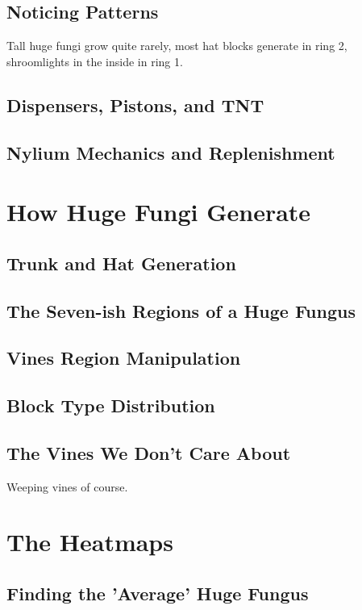 \documentclass[11pt,a4paper]{article}
\begin{document}
    \subsection{Noticing Patterns}
Tall huge fungi grow quite rarely, most hat blocks generate in ring 2, shroomlights in the inside in ring 1.
    \lipsum[8]
    \subsection{Dispensers, Pistons, and TNT}
    \lipsum[9]
    \subsection{Nylium Mechanics and Replenishment}
    \lipsum[9]
    
\section{How Huge Fungi Generate}
    \subsection{Trunk and Hat Generation} %
    \lipsum[10]
    \subsection{The Seven-ish Regions of a Huge Fungus}
    \lipsum[10]
    \subsection{Vines Region Manipulation}
    \lipsum[10]
    \subsection{Block Type Distribution}
    \lipsum[10]
    \subsection{The Vines We Don't Care About}
Weeping vines of course.
    \lipsum[10]

\section{The Heatmaps}
    \subsection{Finding the 'Average' Huge Fungus}
    \lipsum[11]
\end{document}
